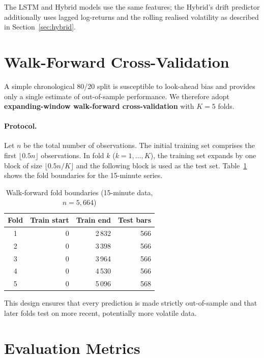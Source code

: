 \documentclass[12pt, a4paper, oneside]{report}
\theoremstyle{plain}
\theoremstyle{definition}
\theoremstyle{remark}
\begin{document}
The LSTM and Hybrid models use the same features; the Hybrid's drift predictor
additionally uses lagged log-returns and the rolling realised volatility as
described in Section~\ref{sec:hybrid}.

\section{Walk-Forward Cross-Validation}
\label{sec:wfcv}

A simple chronological 80/20 split is susceptible to look-ahead bias and
provides only a single estimate of out-of-sample performance.  We therefore
adopt \textbf{expanding-window walk-forward cross-validation} with $K = 5$
folds.

\paragraph{Protocol.}
Let $n$ be the total number of observations.  The initial training set
comprises the first $\lfloor 0.5 n \rfloor$ observations.  In fold $k$
($k = 1, \ldots, K$), the training set expands by one block of size
$\lfloor 0.5n / K \rfloor$ and the following block is used as the test set.
Table~\ref{tab:wf_splits} shows the fold boundaries for the 15-minute series.

\begin{table}[H]
\begin{singlespace}
\fontsize{10}{11}\selectfont
\caption{Walk-forward fold boundaries (15-minute data, $n = 5{,}664$)}
\label{tab:wf_splits}
\begin{tabular}{@{}crrr@{}}
\toprule
Fold & Train start & Train end & Test bars \\
\midrule
1 & 0    & 2\,832 & 566 \\
2 & 0    & 3\,398 & 566 \\
3 & 0    & 3\,964 & 566 \\
4 & 0    & 4\,530 & 566 \\
5 & 0    & 5\,096 & 568 \\
\bottomrule
\end{tabular}
\end{singlespace}
\end{table}

This design ensures that every prediction is made strictly out-of-sample and
that later folds test on more recent, potentially more volatile data.

\section{Evaluation Metrics}
\end{document}
